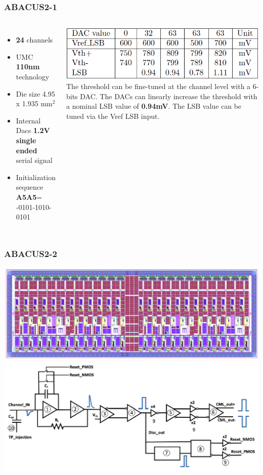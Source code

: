 \documentclass[aspectratio=169]{beamer}
\begin{document}
	\begin{frame}
	\frametitle{ABACUS2-1}
		\begin{columns}
			\begin{itemize}
				\item \textbf{24} channels
				\item UMC \textbf{110nm} technology
				\item Die size 4.95 x 1.935 mm$^2$
				\item Internal Dacs \textbf{1.2V single ended} serial signal
				\item Initialization sequence \textbf{A5A5}= 
				-0101-1010-0101
			\end{itemize}
			\begin{center}
				\includegraphics[width=0.8 \textwidth]{IMG/TableLSB.PNG}
				\newline
				The threshold can be fine-tuned at the channel level with a 6-bits DAC. The DACs can linearly increase the threshold with a nominal LSB value of \textbf{0.94mV}. The LSB value can be tuned via the Vref LSB input.
			\end{center}
		\end{columns}
	\end{frame}

	
	\begin{frame}
	\frametitle{ABACUS2-2}
	\begin{center}
		\includegraphics[width=0.6 \textwidth]{IMG/ABACUS.PNG}
		\includegraphics[width=0.6 \textwidth]{IMG/ABACUS_channel.PNG}
	\end{center}
	\end{frame}
\end{document}
